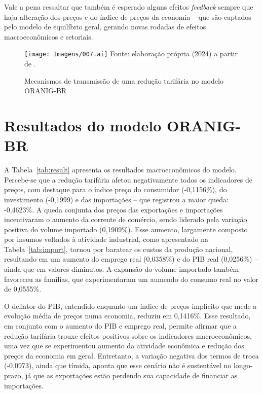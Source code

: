 Vale a pena ressaltar que também é esperado alguns efeitos \textit{feedback} sempre que haja alteração dos preços e do índice de preços da economia -- que são captados pelo modelo de equilíbrio geral, gerando novas rodadas de efeitos macroeconômicos e setoriais.


\begin{figure}[H]
	\centering
	\caption{Mecanismos de transmissão de uma redução tarifária no modelo ORANIG-BR} \label{fig:mecanismos}
	\texttt{[image: Imagens/007.ai]}
	\footnotesize
	Fonte: elaboração própria (2024) a partir de \textcite{vinicius18}.
\end{figure}



\section{Resultados do modelo ORANIG-BR} \label{sec:resultados}

A Tabela~\ref{tab:result} apresenta os resultados macroeconômicos do modelo. Percebe-se que a redução tarifária afetou negativamente todos os indicadores de preços, com destaque para o índice preço do consumidor (-0,1156\%), do investimento (-0,1999) e das importações -- que registrou a maior queda: -0,4623\%. A queda conjunta dos preços das exportações e importações incentivaram o aumento da corrente de comércio, sendo liderado pela variação positiva do volume importado (0,1909\%). Esse aumento, largamente composto por insumos voltados à atividade industrial, como apresentado na Tabela~\ref{tab:import}, tornou por baratear os custos da produção nacional, resultando em um aumento do emprego real (0,0358\%) e do PIB real (0,0256\%) -- ainda que em valores diminutos. A expansão do volume importado também favoreceu as famílias, que experimentaram um aumendo do consumo real no valor de 0,0555\%.

O deflator do PIB, entendido enquanto um índice de preços implícito que mede a evolução média de preços numa economia, reduziu em 0,1416\%. Esse resultado, em conjunto com o aumento do PIB e emprego real, permite afirmar que a redução tarifária trouxe efeitos positivos sobre os indicadores macroeconômicos, uma vez que se experimentou aumento da atividade econômica e redução dos preços da economia em geral. Entretanto, a variação negativa dos termos de troca (-0,0973), ainda que tímida, aponta que esse cenário não é sustentável no longo-prazo, já que as exportações estão perdendo sua capacidade de financiar as importações. 


